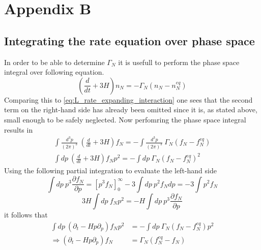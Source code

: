 \chapter{Appendix B}
\section{Integrating the rate equation over phase space}
\label{ap:phase_space}
In order to be able to determine $\Gamma_N$ it is usefull to perform the phase space integral over following equation. 
\begin{equation*}
\left(\frac{d}{dt}+3H\right)n_N=-\Gamma_N\left(n_N-n_N^{eq}\right)
\end{equation*}
Comparing this to \ref{eq:L_rate_expanding_interaction} one sees that the second term on the right-hand side has already been omitted since it is, as stated above, small enough to be safely neglected. \newline
Now perfomring the phase space integral results in
\begin{align*}
\int\frac{d^3p}{\left(2\pi\right)^3}\: \left(\frac{d}{dt}+3H\right)f_N=-\int\frac{d^3p}{\left(2\pi\right)^3}\:\Gamma_N\left(f_N-f_N^{eq}\right)\\
\int dp\: \left(\frac{d}{dt}+3H\right)f_Np^2=-\int dp\:\Gamma_N\left(f_N-f_N^{eq}\right)^2
\end{align*}
Using the following partial integration to evaluate the left-hand side
\begin{equation*}
\int dp\:p^3\frac{\partial f_N}{\partial p}=\left[p^3f_N\right]_0^\infty-3\int dp\:p^2f_Ndp=-3\int p^2f_N
\end{equation*}
\begin{equation*}
3H\int dp\: f_Np^2=-H\int dp\: p^3\frac{\partial f_N}{\partial p}
\end{equation*}
it follows that
\begin{align*}
\int  dp\:\left(\partial_t-Hp\partial_p\right)f_Np^2&=-\int dp\:\Gamma_N\left(f_N-f_N^{eq}\right)p^2\\
\Rightarrow \left(\partial_t-Hp\partial_p\right)f_N&=\Gamma_N\left(f_N^{eq}-f_N\right)
\end{align*}
